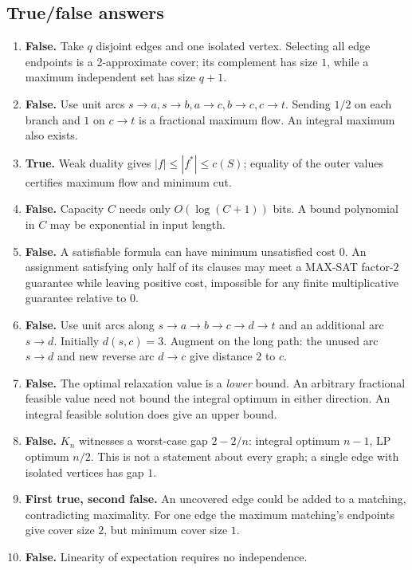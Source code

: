 \documentclass[10pt]{article}
\theoremstyle{definition}
\begin{document}
\subsection{True/false answers}
\begin{enumerate}[label=\textbf{T\arabic*.}]
  \item \textbf{False.} Take $q$ disjoint edges and one isolated vertex.
        Selecting all edge endpoints is a 2-approximate cover; its complement
        has size $1$, while a maximum independent set has size $q+1$.
  \item \textbf{False.} Use unit arcs $s\to a,s\to b,a\to c,b\to c,c\to t$.
        Sending $1/2$ on each branch and $1$ on $c\to t$ is a fractional
        maximum flow.  An integral maximum also exists.
  \item \textbf{True.} Weak duality gives $|f|\le|f^*|\le c(S)$;
        equality of the outer values certifies maximum flow and minimum cut.
  \item \textbf{False.} Capacity $C$ needs only $O(\log(C+1))$ bits.
        A bound polynomial in $C$ may be exponential in input length.
  \item \textbf{False.} A satisfiable formula can have minimum unsatisfied
        cost $0$.  An assignment satisfying only half of its clauses may
        meet a MAX-SAT factor-$2$ guarantee while leaving positive cost,
        impossible for any finite multiplicative guarantee relative to $0$.
  \item \textbf{False.} Use unit arcs along $s\to a\to b\to c\to d\to t$
        and an additional arc $s\to d$.  Initially $d(s,c)=3$.  Augment
        on the long path: the unused arc $s\to d$ and new reverse arc
        $d\to c$ give distance $2$ to $c$.
  \item \textbf{False.} The optimal relaxation value is a \emph{lower}
        bound.  An arbitrary fractional feasible value need not bound the
        integral optimum in either direction.  An integral feasible solution
        does give an upper bound.
  \item \textbf{False.} $K_n$ witnesses a worst-case gap $2-2/n$:
        integral optimum $n-1$, LP optimum $n/2$.  This is not a statement
        about every graph; a single edge with isolated vertices has gap $1$.
  \item \textbf{First true, second false.} An uncovered edge could be added
        to a matching, contradicting maximality.  For one edge the maximum
        matching's endpoints give cover size $2$, but minimum cover size $1$.
  \item \textbf{False.} Linearity of expectation requires no independence.
\end{enumerate}
\end{document}
